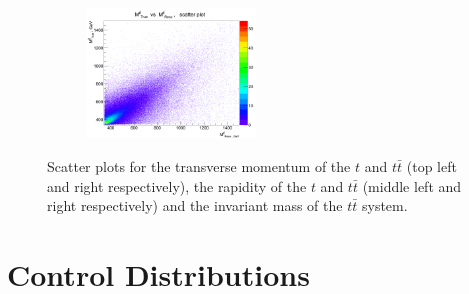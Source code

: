 \begin{figure}[t]
\begin{subfigure}
\end{subfigure}
\begin{subfigure}
  \centering
  \includegraphics[width=0.49\textwidth]{05_kinReco/plots/scatter/mtt-scaterPlot.png}
\end{subfigure}
\caption{Scatter plots for the transverse momentum of the $t$ and $t\bar{t}$ (top left and right respectively), the rapidity of the $t$ and $t\bar{t}$ (middle left and 
         right respectively) and the invariant mass of the $t\bar{t}$ system.}
\label{fig:ScatterPl}
\end{figure}

\section{Control Distributions}

